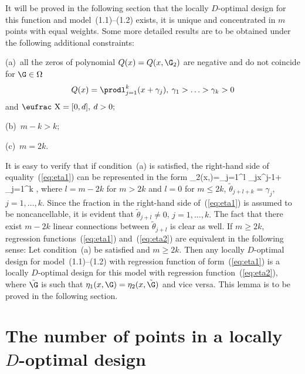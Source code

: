 It will be proved in the following section that the locally $D$-optimal
design for this function and model~(1.1)--(1.2) exists, it is unique
and concentrated in $m$ points with equal weights. Some more detailed
results are to be obtained under the following additional constraints:

\noindent
(a)~all the zeros of polynomial $Q(x)=Q(x,\G_2)$ are negative and do not
coincide for $\G\in\Omega$
$$
 Q(x)=\prodl_{j=1}^k (x+\gamma_j),\>
 \gamma_1>\ldots>\gamma_k>0
$$
and ${\mbox{\eufrac X}}=[0,d],\>d>0;$

\noindent
(b)~$m-k>k;$

\noindent
(c)~$m=2k.$

It is easy to verify that if condition~(a) is satisfied, the right-hand
side of equality~(\ref{eq:eta1}) can be represented in the form
\beq
 \eta_2(x,\tilde{\G})=\suml_{j=1}^l \tilde\theta_jx^{j-1}+
  \suml_{j=1}^k ,
 \label{eq:eta2}
\eeq
where $l=m-2k$ for $m>2k$ and $l=0$ for $m\le 2k$,
$\tilde\theta_{j+l+k}=\gamma_j$, $j=1,\ldots,k.$
Since the fraction in the right-hand side of~(\ref{eq:eta1})
is assumed to be noncancellable, it is evident that
$\tilde\theta_{j+l}\neq 0$, $j=1,\ldots,k.$ The fact that there exist
$m-2k$ linear connections between $\tilde\theta_{j+l}$ is clear as well.
If $m\ge 2k$, regression functions~(\ref{eq:eta1}) and~(\ref{eq:eta2})
are equivalent in the following sense:
\bl
 \label{th:eta1=eta2}
 Let condition~(a) be satisfied and $m\ge 2k$.
 Then any locally $D$-optimal design for model~(1.1)--(1.2)
 with regression function of form~(\ref{eq:eta1}) is a locally
 $D$-optimal design for this model with regression function~(\ref{eq:eta2}),
 where $\tilde{\G}$ is such that $\eta_1(x,\G)=\eta_2(x,\tilde{\G})$
 and vice versa.
\el
This lemma is to be proved in the following section.


\section{The number of points in a locally $D$-optimal design}


